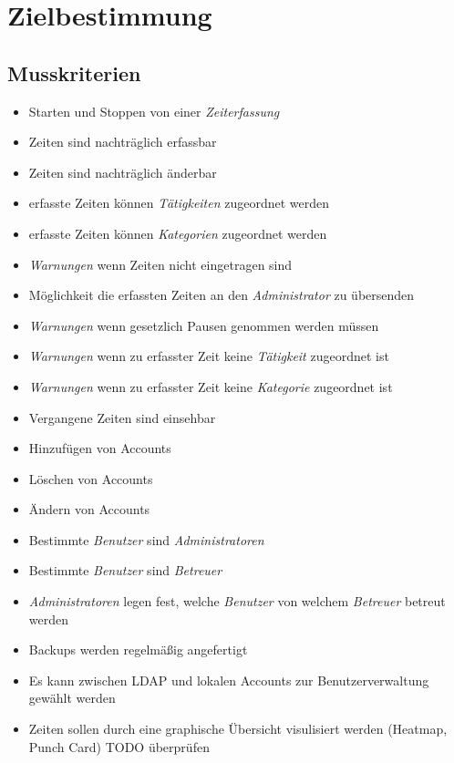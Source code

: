 \section{Zielbestimmung}

\subsection{Musskriterien}

\begin{itemize}
	\item Starten und Stoppen von einer \emph{Zeiterfassung}
	\item Zeiten sind nachträglich erfassbar
	\item Zeiten sind nachträglich änderbar
	\item erfasste Zeiten können \emph{Tätigkeiten} zugeordnet werden
	\item erfasste Zeiten können \emph{Kategorien} zugeordnet werden
	\item \emph{Warnungen} wenn Zeiten nicht eingetragen sind
	\item Möglichkeit die erfassten Zeiten an den \emph{Administrator} zu übersenden
	\item \emph{Warnungen} wenn gesetzlich Pausen genommen werden müssen
	\item \emph{Warnungen} wenn zu erfasster Zeit keine \emph{Tätigkeit} zugeordnet ist
	\item \emph{Warnungen} wenn zu erfasster Zeit keine \emph{Kategorie} zugeordnet ist
	\item Vergangene Zeiten sind einsehbar
	\item Hinzufügen von Accounts
	\item Löschen von Accounts
	\item Ändern von Accounts
	\item Bestimmte \emph{Benutzer} sind \emph{Administratoren}
	\item Bestimmte \emph{Benutzer} sind \emph{Betreuer}
	\item \emph{Administratoren} legen fest, welche \emph{Benutzer} von welchem \emph{Betreuer} betreut werden
	\item Backups werden regelmäßig angefertigt
	\item Es kann zwischen LDAP und lokalen Accounts zur Benutzerverwaltung gewählt werden
	\item Zeiten sollen durch eine graphische Übersicht visulisiert werden (Heatmap, Punch Card) TODO überprüfen
\end{itemize}


